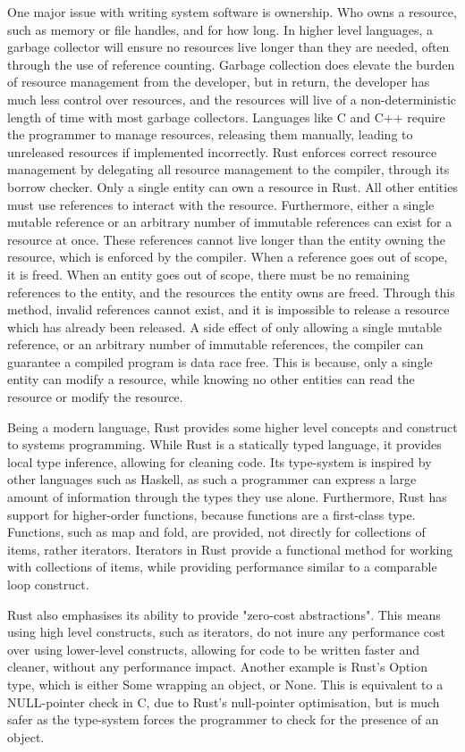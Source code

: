 \documentclass{l4proj}
\begin{document}
One major issue with writing system software is ownership.
Who owns a resource, such as memory or file handles, and for how long.
In higher level languages, a garbage collector will ensure no resources live longer than they are needed, often through the use of reference
counting.
Garbage collection does elevate the burden of resource management from the developer, but in return, the developer has much less control
over resources, and the resources will live of a non-deterministic length of time with most garbage collectors.
Languages like C and C++ require the programmer to manage resources, releasing them manually, leading to unreleased resources if implemented
incorrectly.
Rust enforces correct resource management by delegating all resource management to the compiler, through its borrow checker.
Only a single entity can own a resource in Rust.
All other entities must use references to interact with the resource.
Furthermore, either a single mutable reference or an arbitrary number of immutable references can exist for a resource at once.
These references cannot live longer than the entity owning the resource, which is enforced by the compiler.
When a reference goes out of scope, it is freed.
When an entity goes out of scope, there must be no remaining references to the entity, and the resources the entity owns are freed.
Through this method, invalid references cannot exist, and it is impossible to release a resource which has already been released.
A side effect of only allowing a single mutable reference, or an arbitrary number of immutable references, the compiler can guarantee a
compiled program is data race free.
This is because, only a single entity can modify a resource, while knowing no other entities can read the resource or modify the resource.

Being a modern language, Rust provides some higher level concepts and construct to systems programming.
While Rust is a statically typed language, it provides local type inference, allowing for cleaning code.
Its type-system is inspired by other languages such as Haskell, as such a programmer can express a large amount of information through
the types they use alone.
Furthermore, Rust has support for higher-order functions, because functions are a first-class type.
Functions, such as map and fold, are provided, not directly for collections of items, rather iterators.
Iterators in Rust provide a functional method for working with collections of items, while providing performance similar to a comparable
loop construct.

Rust also emphasises its ability to provide "zero-cost abstractions".
This means using high level constructs, such as iterators, do not inure any performance cost over using lower-level constructs, allowing for
code to be written faster and cleaner, without any performance impact.
Another example is Rust's Option type, which is either Some wrapping an object, or None.
This is equivalent to a NULL-pointer check in C, due to Rust's null-pointer optimisation, but is much safer as the type-system forces the
programmer to check for the presence of an object.
\end{document}

